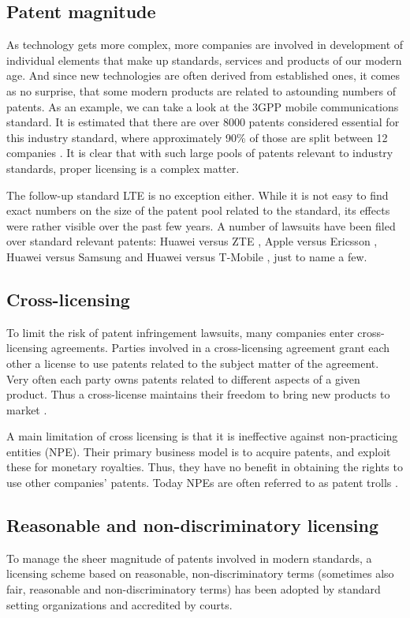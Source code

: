 \documentclass[a4paper]{report}
\begin{document}
\subsection{Patent magnitude}
As technology gets more complex, more companies are involved in development of individual elements that make up standards, services and products of our modern age. And since new technologies are often derived from established ones, it comes as no surprise, that some modern products are related to astounding numbers of patents. As an example, we can take a look at the 3GPP mobile communications standard. It is estimated that there are over 8000 patents considered essential for this industry standard, where approximately 90\% of those are split between 12 companies \parencite{Wiki3G}. It is clear that with such large pools of patents relevant to industry standards, proper licensing is a complex matter.

The follow-up standard LTE is no exception either. While it is not easy to find exact numbers on the size of the patent pool related to the standard, its effects were rather visible over the past few years. A number of lawsuits have been filed over standard relevant patents: Huawei versus ZTE \parencite{HuaweiVsZTE}, Apple versus Ericsson \parencite{AppleVsEricsson}, Huawei versus Samsung \parencite{HuaweiVsSamsung} and Huawei versus T-Mobile \parencite{HuaweiVsTmobile}, just to name a few.

\subsection{Cross-licensing}
To limit the risk of patent infringement lawsuits, many companies enter cross-licensing agreements. Parties involved in a cross-licensing agreement grant each other a license to use patents related to the subject matter of the agreement. Very often each party owns patents related to different aspects of a given product. Thus a cross-license maintains their freedom to bring new products to market \parencite{CrossLicense}.

A main limitation of cross licensing is that it is ineffective against non-practicing entities (NPE). Their primary business model is to acquire patents, and exploit these for monetary royalties. Thus, they have no benefit in obtaining the rights to use other companies' patents. Today NPEs are often referred to as patent trolls \parencite{PatentTroll}. 

\subsection{Reasonable and non-discriminatory licensing}
To manage the sheer magnitude of patents involved in modern standards, a licensing scheme based on reasonable, non-discriminatory terms (sometimes also fair, reasonable and non-discriminatory terms) has been adopted by standard setting organizations and accredited by courts.
\end{document}
